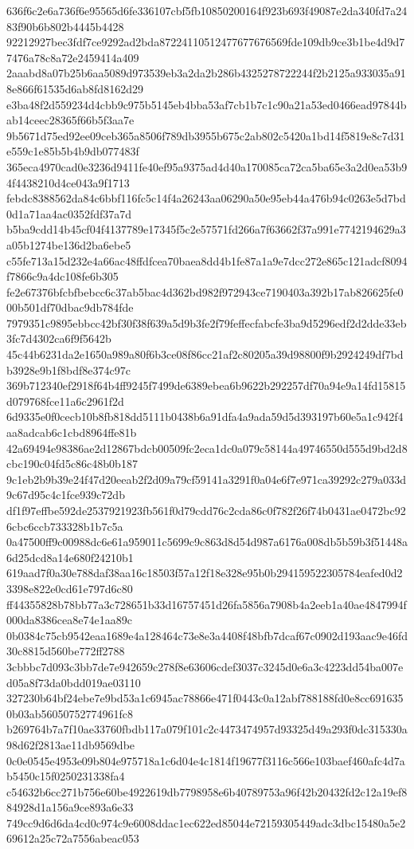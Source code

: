 {636f6c2e6a736f6e95565d6fe336107cbf5fb10850200164f923b693f49087e2da340fd7a2483f90b6b802b4445b4428
92212927bec3fdf7ce9292ad2bda87224110512477677676569fde109db9ce3b1be4d9d77476a78c8a72e2459414a409
2aaabd8a07b25b6aa5089d973539eb3a2da2b286b4325278722244f2b2125a933035a918e866f61535d6ab8fd8162d29
e3ba48f2d559234d4cbb9c975b5145eb4bba53af7cb1b7c1c90a21a53ed0466ead97844bab14ceec28365f66b5f3aa7e
9b5671d75ed92ee09ceb365a8506f789db3955b675c2ab802c5420a1bd14f5819e8c7d31e559c1e85b5b4b9db077483f
365eca4970cad0e3236d9411fe40ef95a9375ad4d40a170085ca72ca5ba65e3a2d0ea53b94f4438210d4ce043a9f1713
febdc8388562da84c6bbf116fc5c14f4a26243aa06290a50e95eb44a476b94c0263e5d7bd0d1a71aa4ac0352fdf37a7d
b5ba9cdd14b45cf04f4137789e17345f5c2e57571fd266a7f63662f37a991e7742194629a3a05b1274be136d2ba6ebe5
c55fe713a15d232e4a66ac48ffdfcea70baea8dd4b1fe87a1a9e7dcc272e865c121adcf8094f7866c9a4dc108fe6b305
fe2e67376bfcbfbebcc6c37ab5bac4d362bd982f972943ce7190403a392b17ab826625fe000b501df70dbac9db784fde
7979351c9895ebbcc42bf30f38f639a5d9b3fe2f79feffecfabcfe3ba9d5296edf2d2dde33eb3fc7d4302ca6f9f5642b
45c44b6231da2e1650a989a80f6b3ce08f86cc21af2c80205a39d98800f9b2924249df7bdb3928e9b1f8bdf8e374c97c
369b712340ef2918f64b4ff9245f7499de6389ebea6b9622b292257df70a94e9a14fd15815d079768fce11a6c2961f2d
6d9335e0f0cecb10b8fb818dd5111b0438b6a91dfa4a9ada59d5d393197b60e5a1c942f4aa8adcab6c1cbd8964ffe81b
42a69494e98386ae2d12867bdcb00509fc2eca1dc0a079c58144a49746550d555d9bd2d8cbc190c04fd5c86c48b0b187
9c1eb2b9b39e24f47d20eeab2f2d09a79cf59141a3291f0a04e6f7e971ca39292c279a033d9c67d95c4c1fce939c72db
df1f97effbe592de2537921923fb561f0d79cdd76c2cda86c0f782f26f74b0431ae0472bc926cbc6ccb733328b1b7c5a
0a47500ff9c00988dc6e61a959011c5699c9c863d8d54d987a6176a008db5b59b3f51448a6d25dcd8a14e680f24210b1
619aad7f0a30e788daf38aa16c18503f57a12f18e328e95b0b294159522305784eafed0d23398e822e0cd61e797d6c80
ff44355828b78bb77a3c728651b33d16757451d26fa5856a7908b4a2eeb1a40ae4847994f000da8386cea8e74e1aa89c
0b0384c75cb9542eaa1689e4a128464c73e8e3a4408f48bfb7dcaf67c0902d193aac9e46fd30c8815d560be772ff2788
3cbbbc7d093c3bb7de7e942659c278f8e63606cdef3037c3245d0e6a3c4223dd54ba007ed05a8f73da0bdd019ae03110
327230b64bf24ebe7e9bd53a1c6945ac78866e471f0443c0a12abf788188fd0e8cc6916350b03ab56050752774961fc8
b269764b7a7f10ae33760fbdb117a079f101c2c4473474957d93325d49a293f0dc315330a98d62f2813ae11db9569dbe
0c0e0545e4953e09b804e975718a1c6d04e4c1814f19677f3116c566e103baef460afc4d7ab5450c15f0250231338fa4
c54632b6cc271b756e60be4922619db7798958e6b40789753a96f42b20432fd2c12a19ef884928d1a156a9ce893a6e33
749cc9d6d6da4cd0c974c9e6008ddac1ec622ed85044e72159305449adc3dbc15480a5e269612a25c72a7556abeac053
}
